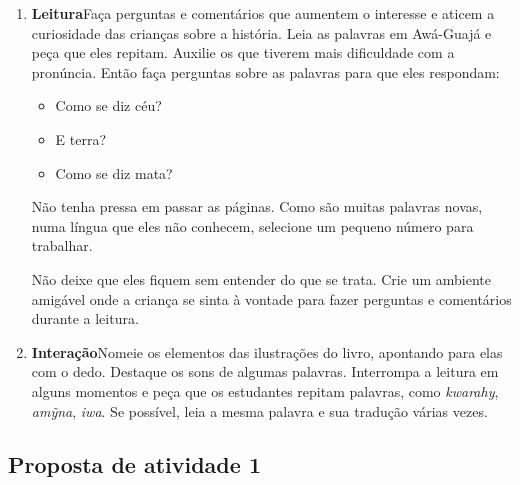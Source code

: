 \documentclass[11pt]{extarticle}
\begin{document}
\begin{enumerate}


\item \textbf{Leitura}\quad Faça perguntas e comentários que aumentem o 
interesse e aticem a curiosidade das crianças sobre a história. Leia 
as palavras em Awá-Guajá e peça que eles repitam. Auxilie os que tiverem
mais dificuldade com a pronúncia. Então faça perguntas sobre as palavras
para que eles respondam:

\begin{itemize}
\item Como se diz céu?
\item E terra?
\item Como se diz mata?
\end{itemize}

Não tenha pressa em passar as páginas. Como são muitas palavras novas,
numa língua que eles não conhecem, selecione um pequeno número para
trabalhar. 

Não deixe que eles fiquem sem entender do que se trata. Crie 
um ambiente amigável onde a criança se sinta à vontade para fazer 
perguntas e comentários durante a leitura.


\item \textbf{Interação}\quad Nomeie os elementos das ilustrações 
do livro, apontando para elas com o dedo. Destaque os sons de algumas 
palavras. Interrompa a leitura em alguns momentos e peça que 
os estudantes repitam palavras, como \textit{kwarahy}, \textit{amỹna}, \textit{iwa}. Se possível, 
leia a mesma palavra e sua tradução várias vezes.
\end{enumerate}


\subsection{Proposta de atividade 1}

 
\end{document}
